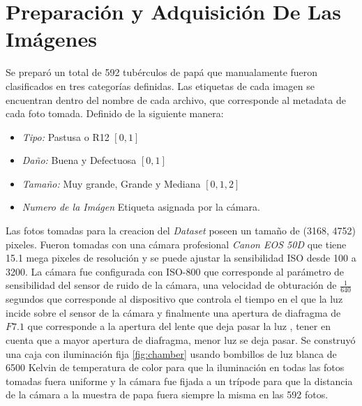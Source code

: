 \section{Preparación y Adquisición De Las Imágenes}

	Se preparó un total de 592 tubérculos de papá que manualamente fueron clasificados en tres categorías definidas. Las etiquetas de cada imagen se encuentran dentro del nombre de cada archivo, que corresponde al metadata de cada foto tomada. Definido de la siguiente manera:
	
	\begin{itemize}
		\item \textit{Tipo:} Pastusa o R12 $[0,1]$
		\item \textit{Daño:} Buena y Defectuosa $[0,1]$
		\item \textit{Tamaño:} Muy grande, Grande y Mediana $[0,1,2]$
		\item \textit{Numero de la Imágen} Etiqueta asignada por la cámara.
	\end{itemize}	
	
	Las fotos tomadas para la creacion del \textit{Dataset} poseen un tamaño de (3168, 4752) pixeles. Fueron tomadas con una cámara profesional \textit{Canon EOS 50D} que tiene 15.1 mega pixeles de resolución y se puede ajustar la sensibilidad ISO desde 100 a 3200. La cámara fue configurada con ISO-800 que corresponde al parámetro de sensibilidad del sensor de ruido de la cámara, una velocidad de obturación de $\frac{1}{640}$ segundos que corresponde al dispositivo que controla el tiempo en el que la luz incide sobre el sensor de la cámara y finalmente una apertura de diafragma de $F7.1$ que corresponde a la apertura del lente que deja pasar la luz \cite{Camara}, tener en cuenta que a mayor apertura de diafragma, menor luz se deja pasar. Se construyó una caja con iluminación fija \ref{fig:chamber} usando bombillos de luz blanca de 6500 Kelvin de temperatura de color para que la iluminación en todas las fotos tomadas fuera uniforme y la cámara fue fijada a un trípode para que la distancia de la cámara a la muestra de papa fuera siempre la misma en las 592 fotos.


